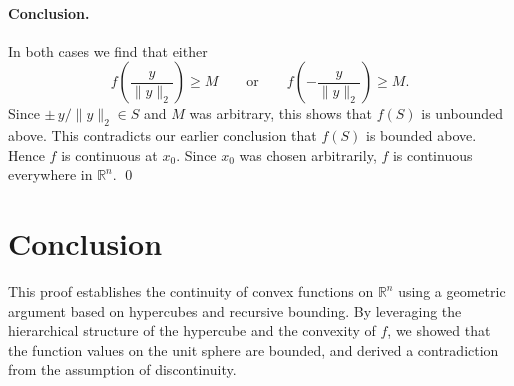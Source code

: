\documentclass[11pt,a4paper]{article}
\begin{document}
\paragraph{Conclusion.}
In both cases we find that either
\[
  f\!\left( \frac{y}{\|y\|_2} \right) \ge M
  \qquad \text{or} \qquad
  f\!\left( -\frac{y}{\|y\|_2} \right) \ge M .
\]
Since $\pm\, y / \|y\|_2 \in S$ and $M$ was arbitrary, this shows that $f(S)$ is
unbounded above. This contradicts our earlier conclusion that $f(S)$ is bounded
above. Hence $f$ is continuous at $x_0$. Since $x_0$ was chosen arbitrarily, $f$
is continuous everywhere in $\mathbb{R}^n$. \qed

\section{Conclusion}

This proof establishes the continuity of convex functions on $\mathbb{R}^n$ using
a geometric argument based on hypercubes and recursive bounding. By leveraging
the hierarchical structure of the hypercube and the convexity of $f$, we showed
that the function values on the unit sphere are bounded, and derived a
contradiction from the assumption of discontinuity.
\end{document}
